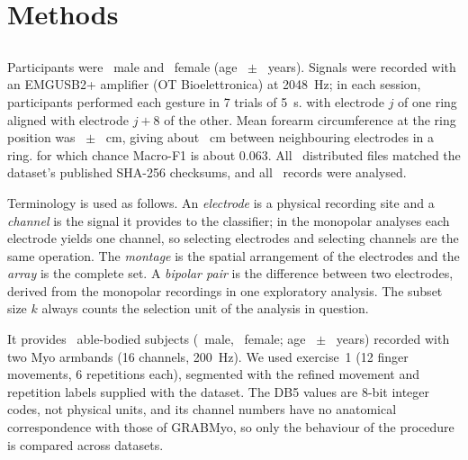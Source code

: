 \section{Methods}
\label{sec:methods}

\subsection[Datasets and signal processing]{}
\label{sec:datasets}

 Participants were \GRABMyoMale\ male and \GRABMyoFemale\ female (age \GRABMyoAgeMean\ $\pm$ \GRABMyoAgeSD\ years). Signals were recorded with an EMGUSB2+ amplifier (OT Bioelettronica) at 2048~Hz; in each session, participants performed each gesture in 7 trials of 5~s.  with electrode $j$ of one ring aligned with electrode $j+8$ of the other. Mean forearm circumference at the ring position was \GRABMyoCircMean\ $\pm$ \GRABMyoCircSD~cm, giving about \GRABMyoArcSpacing~cm between neighbouring electrodes in a ring.  for which chance Macro-F1 is about 0.063. All \GRABMyoFilesVerified\ distributed files matched the dataset's published SHA-256 checksums, and all \GRABMyoRecords\ records were analysed.

Terminology is used as follows. An \emph{electrode} is a physical recording site and a \emph{channel} is the signal it provides to the classifier; in the monopolar analyses each electrode yields one channel, so selecting electrodes and selecting channels are the same operation. The \emph{montage} is the spatial arrangement of the electrodes and the \emph{array} is the complete set. A \emph{bipolar pair} is the difference between two electrodes, derived from the monopolar recordings in one exploratory analysis. The subset size $k$ always counts the selection unit of the analysis in question.

 It provides \DBFiveSubjects\ able-bodied subjects (\DBFiveMale\ male, \DBFiveFemale\ female; age \DBFiveAgeMean\ $\pm$ \DBFiveAgeSD\ years) recorded with two Myo armbands (16 channels, 200~Hz). We used exercise~1 (12 finger movements, 6 repetitions each), segmented with the refined movement and repetition labels supplied with the dataset. The DB5 values are 8-bit integer codes, not physical units, and its channel numbers have no anatomical correspondence with those of GRABMyo, so only the behaviour of the procedure is compared across datasets.

